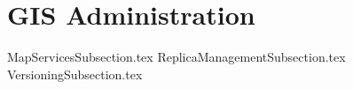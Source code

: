 \documentclass{book}
\title{}  %
\begin{document}
\ifstandalone
\maketitle %
\clearpage
\tableofcontents %
\clearpage
\fi


% 
\section{GIS Administration}

{MapServicesSubsection.tex}
\clearpage
{ReplicaManagementSubsection.tex}
\clearpage
{VersioningSubsection.tex}
\end{document}
